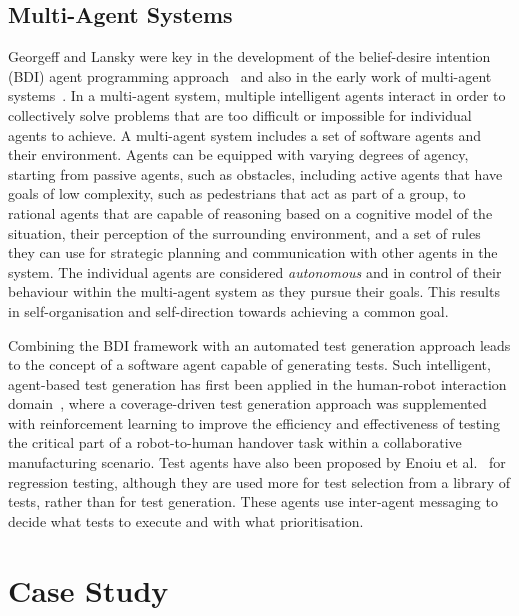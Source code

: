 \documentclass[runningheads,a4paper]{llncs}
\begin{document}
\subsection{Multi-Agent Systems}

Georgeff and Lansky were key in the development of the belief-desire intention (BDI) agent programming approach~\cite{georgeff1987reactive} and also in the early work of multi-agent systems~\cite{georgeff1988communication}.
%
In a multi-agent system, multiple intelligent agents interact in order to collectively solve problems that are too difficult or impossible for individual agents to achieve. 
%
A multi-agent system includes a set of software agents and their environment. Agents can be equipped with varying degrees of agency, starting from  passive agents, such as obstacles, including active agents that have goals of low complexity, such as pedestrians that act as part of a group, to rational agents that are capable of reasoning based on a cognitive model of the situation, their perception of the surrounding environment, and a set of rules they can use for strategic planning and communication with other agents in the system.
%
The individual agents are considered \textit{autonomous} and in control of their behaviour within the multi-agent system as they pursue their goals. 
% 
This results in self-organisation and self-direction towards achieving a common goal. 

Combining the BDI framework with an automated test generation approach leads to the concept of a software agent capable of generating tests.
Such intelligent, agent-based test generation has first been applied in the human-robot interaction domain~\cite{Araiza-Illan2016}, where a coverage-driven test generation approach was supplemented with reinforcement learning to improve the efficiency and effectiveness of testing the critical part of a robot-to-human handover task within a collaborative manufacturing scenario. 
%
Test agents have also been proposed by Enoiu et al.~\cite{Enoiu2019} for regression testing, although they are used more for test selection from a library of tests, rather than for test generation. These agents use inter-agent messaging to decide what tests to execute and with what prioritisation.


\section{Case Study} \label{s:case-study}
 
\end{document}
